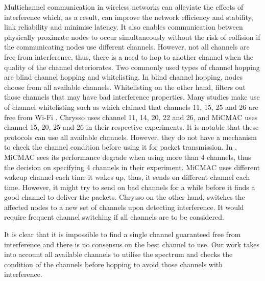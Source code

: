 Multichannel communication in wireless networks can alleviate the effects of interference which, as a result, can improve the network efficiency and stability, link reliability and minimise latency. It also enables communication between physically proximate nodes to occur simultaneously without the risk of collision if the communicating nodes use different channels. However, not all channels are free from interference, thus, there is a need to hop to another channel when the quality of the channel deteriorates. Two commonly used types of channel hopping \cite{watteyne} are blind channel hopping and whitelisting. In blind channel hopping, nodes choose from all available channels. Whitelisting on the other hand, filters out those channels that may have bad interference properties. Many studies make use of channel whitelisting such as \cite{watteyne} which claimed that channels 11, 15, 25 and 26 are free from Wi-Fi \cite{wu}. Chrysso \cite{chrysso} uses channel 11, 14, 20, 22 and 26, and MiCMAC \cite{micmac} uses channel 15, 20, 25 and 26 in their respective experiments. 
It is notable that these protocols can use all available channels. However, they do not have a mechanism to check the channel condition before using it for packet transmission. In \cite{micmac}, MiCMAC sees its performance degrade when using more than 4 channels, thus the decision on specifying 4 channels in their experiment. MiCMAC uses different wakeup channel each time it wakes up, thus, it sends on different channel each time. However, it might try to send on bad channels for a while before it finds a good channel to deliver the packets. Chrysso on the other hand, switches the affected nodes to a new set of channels upon detecting interference. It would require frequent channel switching if all channels are to be considered.


It is clear that it is impossible to find a single channel guaranteed free from interference and there is no consensus on the best channel to use. Our work takes into account all available channels to utilise the spectrum and checks the condition of the channels before hopping to avoid those channels with interference.




